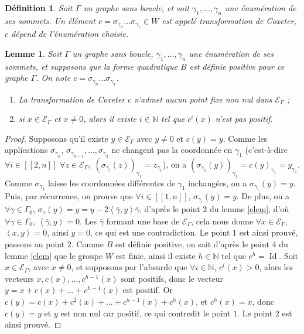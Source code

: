 \documentclass[a4paper,10pt]{article}
\newtheorem{lm}[]{Lemme}[section]
\newtheorem{defi}[]{Définition}[section]
\DeclareMathOperator{\Id}{Id}
\newcommand{\ps}[2]{\left\langle#1,#2\right\rangle}
\newcommand{\EG}{\mathscr{E}_\Gamma}
\newcommand{\ent}[2]{[\![#1,#2]\!]}
\begin{document}
\begin{defi}
	Soit $\Gamma$ un graphe sans boucle, et soit $\gamma_1,\dots,\gamma_n$ une énumération de ses sommets. Un élément $c=\sigma_{\gamma_n}\dots\sigma_{\gamma_1}\in W$ est appelé \emph{transformation de Coxeter}, $c$ dépend de l'énumération choisie.
\end{defi}
\begin{lm}
Soit $\Gamma$ un graphe sans boucle, $\gamma_1,\dots,\gamma_n$ une énumération de ses sommets, et supposons que la forme quadratique $B$ est définie positive pour ce graphe $\Gamma$. On note $c=\sigma_{\gamma_n}\dots\sigma_{\gamma_1}$.
\begin{enumerate}
	\item La transformation de Coxeter $c$ n'admet aucun point fixe non nul dans $\EG$ ;
	\item si $x\in\EG$ et $x\neq0$, alors il existe $i\in\mathbb N$ tel que $c^i(x)$ n'est pas positif.
\end{enumerate}
\end{lm}
\begin{proof}
	Supposons qu'il existe $y\in\EG$ avec $y\neq0$ et $c(y)=y$. Comme les applications $\sigma_{\gamma_n}$, $\sigma_{\gamma_{n-1}},\dots,\sigma_{\gamma_2}$ ne changent pas la coordonnée en $\gamma_1$ (c'est-à-dire $\forall i\in\ent{2}{n}\;\forall z\in\EG,\;(\sigma_{\gamma_i}(z))_{\gamma_1}=z_{\gamma_1}$), on a $(\sigma_{\gamma_1}(y))_{\gamma_1}=c(y)_{\gamma_1}=y_{\gamma_1}$. Comme $\sigma_{\gamma_1}$ laisse les coordonnées différentes de $\gamma_1$ inchangées, on a $\sigma_{\gamma_1}(y)=y$. Puis, par récurrence, on prouve que $\forall i\in\ent{1}{n}$, $\sigma_{\gamma_i}(y)=y$. De plus, on a $\forall\gamma\in\Gamma_0$, $\sigma_{\gamma}(y)=y=y-2\ps{\bar\gamma}{y}\bar\gamma$, d'après le point $2$ du lemme \ref{elem}, d'où $\forall\gamma\in\Gamma_0$, $\ps{\bar\gamma}{y}=0$. Les $\bar\gamma$ formant une base de $\EG$, cela nous donne $\forall x\in\EG$, $\ps{x}{y}=0$, ainsi $y=0$, ce qui est une contradiction. Le point $1$ est ainsi prouvé, passons au point $2$. Comme $B$ est définie positive, on sait d'après le point $4$ du lemme \ref{elem} que le groupe $W$ est finie, ainsi il existe $h\in\mathbb N$ tel que $c^h=\Id$. Soit $x\in\EG$, avec $x\neq0$, et supposons par l'absurde que $\forall i\in\mathbb N$, $c^i(x)>0$, alors les vecteurs $x,c(x),\dots,c^{h-1}(x)$ sont positifs, donc le vecteur $y=x+c(x)+\dots+c^{h-1}(x)$ est positif. Or $c(y)=c(x)+c^2(x)+\dots+c^{h-1}(x)+c^h(x)$, et $c^h(x)=x$, donc $c(y)=y$ et $y$ est non nul car positif, ce qui contredit le point $1$. Le point $2$ est ainsi prouvé.
\end{proof}
\clearpage


\end{document}
